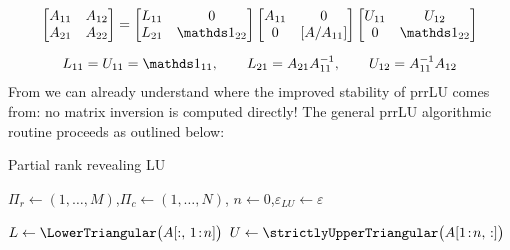 \begin{gather}
	\label{eq:SchurLU}
	\begin{bmatrix}
	A_{11} & A_{12} \\
	A_{21} & A_{22}
	\end{bmatrix}
	=
	\begin{bmatrix}
	L_{11} & 0 \\
	L_{21} & \identity_{22}
	\end{bmatrix}
	\begin{bmatrix}
	A_{11} & 0 \\
	0 & [A / A_{11}]
	\end{bmatrix}
	\begin{bmatrix}
	U_{11} & U_{12} \\
	0 & \identity_{22}
	\end{bmatrix}\\[6pt]
	\nonumber L_{11} = U_{11} = \identity_{11}, \qquad L_{21} = A_{21}A^{-1}_{11}, \qquad U_{12} = A^{-1}_{11}A_{12}
\end{gather} 
From  we can already understand where the improved stability of prrLU comes from: no matrix inversion is computed directly! The general prrLU algorithmic routine proceeds as outlined below:  

\vspace{1.5\baselineskip}
\begin{algorithm}[H]
	\caption{Partial rank revealing LU}
	\label{alg:prrLU}


    $\Pi_r\leftarrow(1,\dots,M)$,\quad $\Pi_c\leftarrow(1,\dots,N)$,\quad 
	$n\leftarrow0$,\quad $\varepsilon_{LU} \leftarrow \varepsilon$\;

	
	$L\leftarrow\LowerTriangular\bigl(A[:,\,1\!:\!n]\bigr)$\;
	$U\leftarrow\strictlyUpperTriangular\bigl(A[1\!:\!n,\,:]\bigr)$\;
	\;
\end{algorithm}
\vspace{2\baselineskip}

